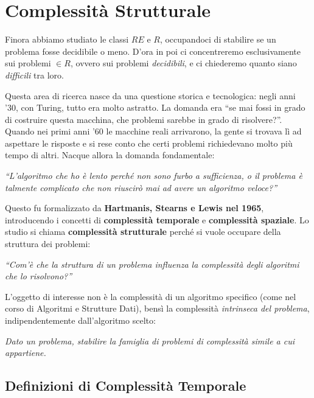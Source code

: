 % 
\chapter{Complessità Strutturale}

Finora abbiamo studiato le classi $RE$ e $R$, occupandoci di stabilire se un problema fosse decidibile o meno. D'ora in poi ci concentreremo esclusivamente sui problemi $\in R$, ovvero sui problemi \textit{decidibili}, e ci chiederemo quanto siano \textit{difficili} tra loro.

Questa area di ricerca nasce da una questione storica e tecnologica: negli anni '30, con Turing, tutto era molto astratto. La domanda era ``se mai fossi in grado di costruire questa macchina, che problemi sarebbe in grado di risolvere?''. Quando nei primi anni '60 le macchine reali arrivarono, la gente si trovava lì ad aspettare le risposte e si rese conto che certi problemi richiedevano molto più tempo di altri. Nacque allora la domanda fondamentale:

\begin{center}
\textit{``L'algoritmo che ho è lento perché non sono furbo a sufficienza, o il problema è talmente complicato che non riuscirò mai ad avere un algoritmo veloce?''}
\end{center}

Questo fu formalizzato da \textbf{Hartmanis, Stearns e Lewis nel 1965}, introducendo i concetti di \textbf{complessità temporale} e \textbf{complessità spaziale}. Lo studio si chiama \textbf{complessità strutturale} perché si vuole occupare della struttura dei problemi:

\begin{center}
\textit{``Com'è che la struttura di un problema influenza la complessità degli algoritmi che lo risolvono?''}
\end{center}

L'oggetto di interesse non è la complessità di un algoritmo specifico (come nel corso di Algoritmi e Strutture Dati), bensì la complessità \textit{intrinseca del problema}, indipendentemente dall'algoritmo scelto:

\begin{center}
\textit{Dato un problema, stabilire la famiglia di problemi di complessità simile a cui appartiene.}
\end{center}

\section{Definizioni di Complessità Temporale}


